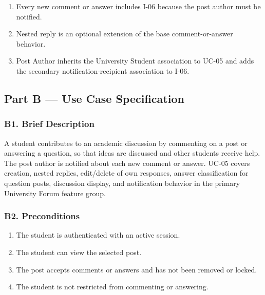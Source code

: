 \documentclass[12pt]{article}
\begin{document}
\begin{enumerate}
\item Every new comment or answer includes I-06 because the post author must be notified.
\item Nested reply is an optional extension of the base comment-or-answer behavior.
\item Post Author inherits the University Student association to UC-05 and adds the secondary notification-recipient association to I-06.
\end{enumerate}
\par\medskip

\hypertarget{sec:part-b-use-case-specification}{}
\subsection*{Part B --- Use Case Specification}
\par\medskip

\hypertarget{sec:b1-brief-description}{}
\subsubsection*{B1. Brief Description}
\par\medskip

A student contributes to an academic discussion by commenting on a post or answering a question, so that ideas are discussed and other students receive help. The post author is notified about each new comment or answer. UC-05 covers creation, nested replies, edit/delete of own responses, answer classification for question posts, discussion display, and notification behavior in the primary University Forum feature group.
\par\medskip

\hypertarget{sec:b2-preconditions}{}
\subsubsection*{B2. Preconditions}
\par\medskip

\begin{enumerate}
\item The student is authenticated with an active session.
\item The student can view the selected post.
\item The post accepts comments or answers and has not been removed or locked.
\item The student is not restricted from commenting or answering.
\end{enumerate}
\par\medskip
\end{document}
